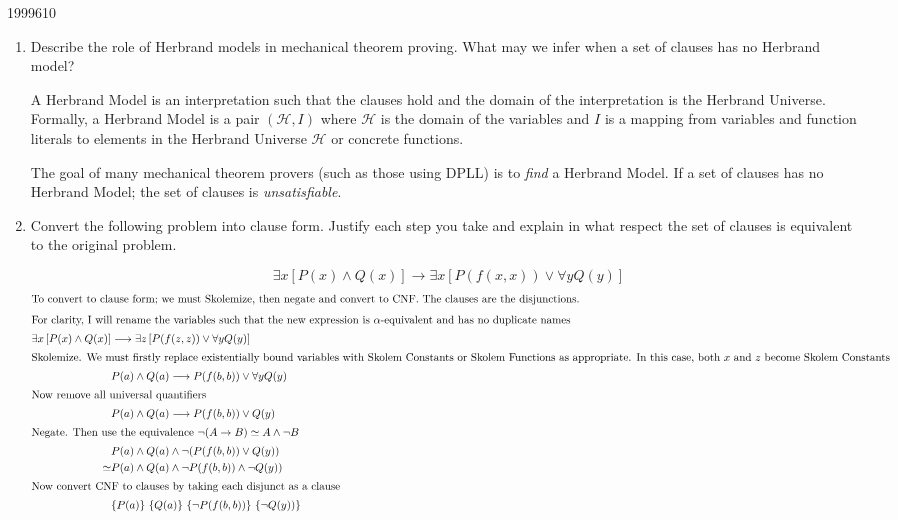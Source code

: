 \documentclass[10pt,\jkfside,a4paper]{article}
\begin{document}
\begin{examquestion}{1999}{6}{10}

\begin{enumerate}

\item Describe the role of Herbrand models in mechanical theorem proving.
What may we infer when a set of clauses has no Herbrand model?

A Herbrand Model is an interpretation such that the clauses hold and the
domain of the interpretation is the Herbrand Universe. Formally, a Herbrand
Model is a pair $(\mathcal{H}, I)$ where $\mathcal{H}$ is the domain of the
variables and $I$ is a mapping from variables and function literals to
elements in the Herbrand Universe $\mathcal{H}$ or concrete functions.

The goal of many mechanical theorem provers (such as those using DPLL) is to
\textit{find} a Herbrand Model. If a set of clauses has no Herbrand Model;
the set of clauses is \textit{unsatisfiable}.

\item Convert the following problem into clause form. Justify each step you
take and explain in what respect the set of clauses is equivalent to the
original problem.

\[
\exists x \left[ P(x) \wedge Q(x) \right]
\longrightarrow
\exists x \left[ P(f(x, x)) \vee \forall y Q(y) \right]
\]
\begin{align*}
\intertext{To convert to clause form; we must Skolemize, then negate and convert to CNF.
The clauses are the disjunctions.}
\intertext{For clarity, I will rename the variables such
that the new expression is $\alpha$-equivalent and has no duplicate names}
\exists x \left[ P(x) \wedge Q(x) \right]
&\longrightarrow
\exists z \left[ P(f(z, z)) \vee \forall y Q(y) \right] \\
\intertext{Skolemize. We must firstly replace existentially bound variables
with Skolem Constants or Skolem Functions as appropriate. In this case, both
$x$ and $z$ become Skolem Constants}
& P(a) \wedge Q(a)
\longrightarrow
P(f(b, b)) \vee \forall y Q(y) \\
\intertext{Now remove all universal quantifiers}
& P(a) \wedge Q(a)
\longrightarrow
P(f(b, b)) \vee Q(y) \\
\intertext{Negate. Then use the equivalence $\neg(A \to B) \simeq A \wedge
\neg B$}
& P(a) \wedge Q(a)\wedge \neg (P(f(b, b)) \vee Q(y)) \\
\simeq & P(a) \wedge Q(a)\wedge \neg P(f(b, b)) \wedge \neg Q(y)) \\
\intertext{Now convert CNF to clauses by taking each disjunct as a clause}
& \{P(a)\}\ \{Q(a)\}\ \{\neg P(f(b, b))\}\ \{\neg Q(y))\}
\end{align*}


\end{enumerate}
\end{examquestion}
\end{document}
